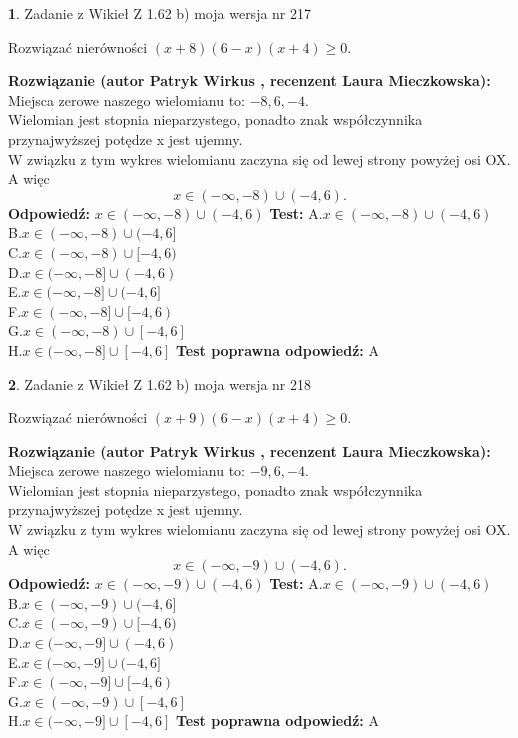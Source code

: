 \documentclass[12pt, a4paper]{article}
\theoremstyle{definition} %
\newtheorem{zad}{}
\newcommand{\zadStart}[1]{\begin{zad}#1\newline}
\newcommand{\zadStop}{\end{zad}}
\newcommand{\rozwStart}[2]{\noindent \textbf{Rozwiązanie (autor #1 , recenzent #2): }\newline}
\newcommand{\rozwStop}{\newline}
\newcommand{\odpStart}{\noindent \textbf{Odpowiedź:}\newline}
\newcommand{\odpStop}{\newline}
\newcommand{\testStart}{\noindent \textbf{Test:}\newline}
\newcommand{\testStop}{\newline}
\newcommand{\kluczStart}{\noindent \textbf{Test poprawna odpowiedź:}\newline}
\newcommand{\kluczStop}{\newline}
\begin{document}
\zadStart{Zadanie z Wikieł Z 1.62 b) moja wersja nr 217}

Rozwiązać nierówności $(x+8)(6-x)(x+4)\ge0$.
\zadStop
\rozwStart{Patryk Wirkus}{Laura Mieczkowska}
Miejsca zerowe naszego wielomianu to: $-8, 6, -4$.\\
Wielomian jest stopnia nieparzystego, ponadto znak współczynnika przy\linebreak najwyższej potędze x jest ujemny.\\ W związku z tym wykres wielomianu zaczyna się od lewej strony powyżej osi OX. A więc $$x \in (-\infty,-8) \cup (-4,6).$$
\rozwStop
\odpStart
$x \in (-\infty,-8) \cup (-4,6)$
\odpStop
\testStart
A.$x \in (-\infty,-8) \cup (-4,6)$\\
B.$x \in (-\infty,-8) \cup (-4,6]$\\
C.$x \in (-\infty,-8) \cup [-4,6)$\\
D.$x \in (-\infty,-8] \cup (-4,6)$\\
E.$x \in (-\infty,-8] \cup (-4,6]$\\
F.$x \in (-\infty,-8] \cup [-4,6)$\\
G.$x \in (-\infty,-8) \cup [-4,6]$\\
H.$x \in (-\infty,-8] \cup [-4,6]$
\testStop
\kluczStart
A
\kluczStop



\zadStart{Zadanie z Wikieł Z 1.62 b) moja wersja nr 218}

Rozwiązać nierówności $(x+9)(6-x)(x+4)\ge0$.
\zadStop
\rozwStart{Patryk Wirkus}{Laura Mieczkowska}
Miejsca zerowe naszego wielomianu to: $-9, 6, -4$.\\
Wielomian jest stopnia nieparzystego, ponadto znak współczynnika przy\linebreak najwyższej potędze x jest ujemny.\\ W związku z tym wykres wielomianu zaczyna się od lewej strony powyżej osi OX. A więc $$x \in (-\infty,-9) \cup (-4,6).$$
\rozwStop
\odpStart
$x \in (-\infty,-9) \cup (-4,6)$
\odpStop
\testStart
A.$x \in (-\infty,-9) \cup (-4,6)$\\
B.$x \in (-\infty,-9) \cup (-4,6]$\\
C.$x \in (-\infty,-9) \cup [-4,6)$\\
D.$x \in (-\infty,-9] \cup (-4,6)$\\
E.$x \in (-\infty,-9] \cup (-4,6]$\\
F.$x \in (-\infty,-9] \cup [-4,6)$\\
G.$x \in (-\infty,-9) \cup [-4,6]$\\
H.$x \in (-\infty,-9] \cup [-4,6]$
\testStop
\kluczStart
A
\kluczStop
\end{document}
